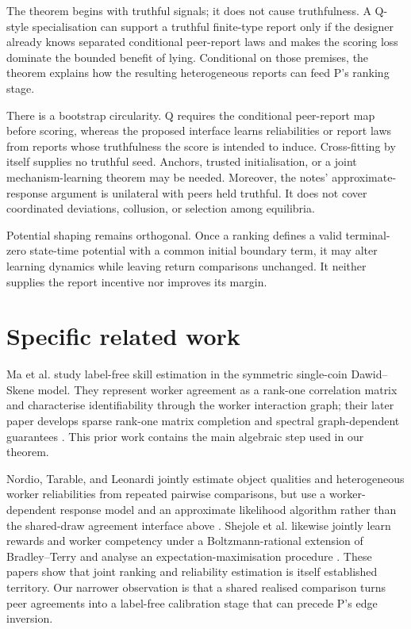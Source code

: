 \documentclass{article}
\begin{document}
The theorem begins with truthful signals; it does not cause truthfulness.  A Q-style specialisation can support a truthful finite-type report only if the designer already knows separated conditional peer-report laws and makes the scoring loss dominate the bounded benefit of lying. %
Conditional on those premises, the theorem explains how the resulting heterogeneous reports can feed P's ranking stage. %

There is a bootstrap circularity.  Q requires the conditional peer-report map before scoring, whereas the proposed interface learns reliabilities or report laws from reports whose truthfulness the score is intended to induce.  Cross-fitting by itself supplies no truthful seed.  Anchors, trusted initialisation, or a joint mechanism-learning theorem may be needed. %
Moreover, the notes' approximate-response argument is unilateral with peers held truthful.  It does not cover coordinated deviations, collusion, or selection among equilibria. %

Potential shaping remains orthogonal.  Once a ranking defines a valid terminal-zero state-time potential with a common initial boundary term, it may alter learning dynamics while leaving return comparisons unchanged.  It neither supplies the report incentive nor improves its margin. %

\section{Specific related work}

Ma et al. study label-free skill estimation in the symmetric single-coin Dawid--Skene model.  They represent worker agreement as a rank-one correlation matrix and characterise identifiability through the worker interaction graph; their later paper develops sparse rank-one matrix completion and spectral graph-dependent guarantees \cite{ma2017crowdsourcing,ma2019gradient}.  This prior work contains the main algebraic step used in our theorem. %

Nordio, Tarable, and Leonardi jointly estimate object qualities and heterogeneous worker reliabilities from repeated pairwise comparisons, but use a worker-dependent response model and an approximate likelihood algorithm rather than the shared-draw agreement interface above \cite{nordio2023quite}.  Shejole et al. likewise jointly learn rewards and worker competency under a Boltzmann-rational extension of Bradley--Terry and analyse an expectation-maximisation procedure \cite{shejole2026signal}.  These papers show that joint ranking and reliability estimation is itself established territory.  Our narrower observation is that a shared realised comparison turns peer agreements into a label-free calibration stage that can precede P's edge inversion. %
\end{document}
